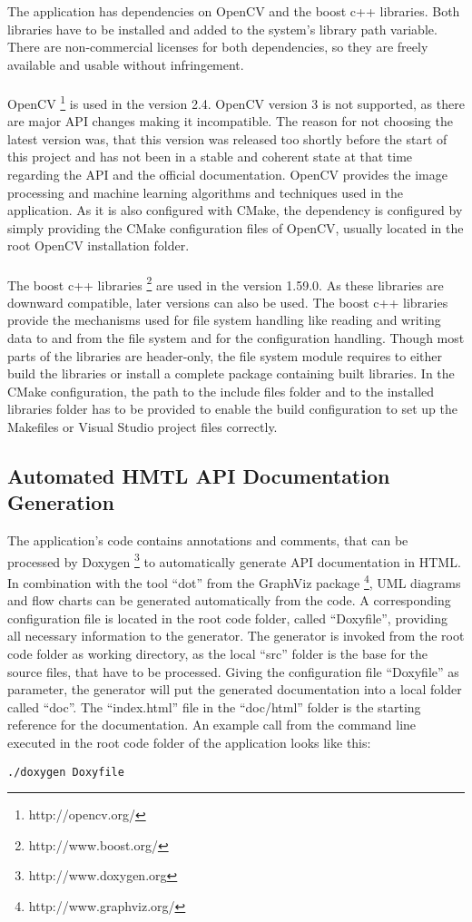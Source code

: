 The application has dependencies on OpenCV and the boost c++ libraries. Both libraries have to be installed and added to the system's library path variable. There are non-commercial licenses for both dependencies, so they are freely available and usable without infringement.
\\
\\
OpenCV \footnote{http://opencv.org/} is used in the version 2.4. OpenCV version 3 is not supported, as there are major API changes making it incompatible. The reason for not choosing the latest version was, that this version was released too shortly before the start of this project and has not been in a stable and coherent state at that time regarding the API and the official documentation. OpenCV provides the image processing and machine learning algorithms and techniques used in the application. As it is also configured with CMake, the dependency is configured by simply providing the CMake configuration files of OpenCV, usually located in the root OpenCV installation folder.
\\
\\
The boost c++ libraries \footnote{http://www.boost.org/} are used in the version 1.59.0. As these libraries are downward compatible, later versions can also be used. The boost c++ libraries provide the mechanisms used for file system handling like reading and writing data to and from the file system and for the configuration handling. Though most parts of the libraries are header-only, the file system module requires to either build the libraries or install a complete package containing built libraries. In the CMake configuration, the path to the include files folder and to the installed libraries folder has to be provided to enable the build configuration to set up the Makefiles or Visual Studio project files correctly.


\subsection{Automated HMTL API Documentation Generation}

The application's code contains annotations and comments, that can be processed by Doxygen \footnote{http://www.doxygen.org} to automatically generate API documentation in HTML. In combination with the tool "`dot"' from the GraphViz package \footnote{http://www.graphviz.org/}, UML diagrams and flow charts can be generated automatically from the code. A corresponding configuration file is located in the root code folder, called "`Doxyfile"', providing all necessary information to the generator. The generator is invoked from the root code folder as working directory, as the local "`src"' folder is the base for the source files, that have to be processed. Giving the configuration file "`Doxyfile"' as parameter, the generator will put the generated documentation into a local folder called "`doc"'. The "`index.html"' file in the "`doc/html"' folder is the starting reference for the documentation. An example call from the command line executed in the root code folder of the application looks like this:
\begin{verbatim}
./doxygen Doxyfile
\end{verbatim}


